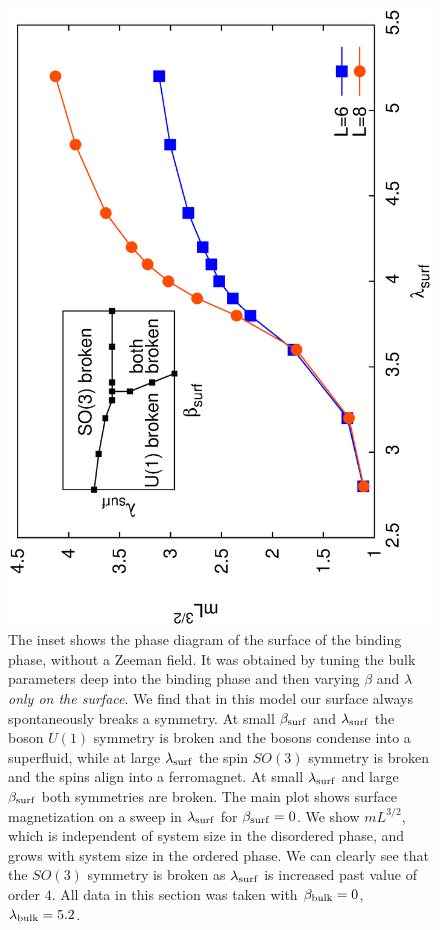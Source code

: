 \documentclass[prb,twocolumn]{revtex4-1}
\begin{document}
\begin{figure}
\includegraphics[angle=-90,width=\linewidth]{figures/heissurf.eps}
\caption{The inset shows the phase diagram of the surface of the binding phase, without a Zeeman field. It was obtained by tuning the bulk parameters deep into the binding phase and then varying $\beta$ and $\lambda$ {\em only on the surface}.  We find that in this model our surface always spontaneously breaks a symmetry. At small $\beta_{\rm surf}$ and $\lambda_{\rm surf}$ the boson $U(1)$ symmetry is broken and the bosons condense into a superfluid, while at large $\lambda_{\rm surf}$ the spin $SO(3)$ symmetry is broken and the spins align into a ferromagnet. At small $\lambda_{\rm surf}$ and large $\beta_{\rm surf}$ both symmetries are broken.  The main plot shows surface magnetization on a sweep in $\lambda_{\rm surf}$ for $\beta_{\rm surf}=0$. We show $mL^{3/2}$, which is independent of system size in the disordered phase, and grows with system size in the ordered phase. We can clearly see that the $SO(3)$ symmetry is broken as $\lambda_{\rm surf}$ is increased past value of order $4$. All data in this section was taken with $\beta_{\rm bulk}=0$, $\lambda_{\rm bulk}=5.2$.}
\label{heissurf}
\end{figure}
\end{document}
